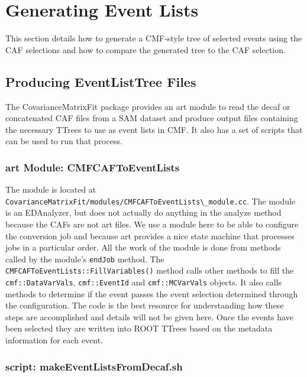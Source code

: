 \section{Generating Event Lists}

This section details how to generate a CMF-style tree of selected events using the CAF selections and how to compare the generated tree to the CAF selection.

\subsection{Producing EventListTree Files}

The CovarianceMatrixFit package provides an art module to read the decaf or concatenated CAF files from a SAM dataset and produce output files containing the necessary TTrees to use as event lists in CMF.  It also has a set of scripts that can be used to run that process.

\subsubsection{art Module: CMFCAFToEventLists}
The module is located at \lstinline{CovarianceMatrixFit/modules/CMFCAFToEventLists\_module.cc}.  The module is an EDAnalyzer, but does not actually do anything in the analyze method because the CAFs are not art files.  We use a module here to be able to configure the conversion job and because art provides a nice state machine that processes jobs in a particular order.  All the work of the module is done from methods called by the module's \lstinline{endJob} method.  The \lstinline{CMFCAFToEventLists::FillVariables()} method calls other methods to fill the \lstinline{cmf::DataVarVals}, \lstinline{cmf::EventId} and \lstinline{cmf::MCVarVals} objects.  It also calls methods to determine if the event passes the event selection determined through the configuration.  The code is the best resource for understanding how these steps are accomplished and details will not be given here.  Once the events have been selected they are written into ROOT TTrees based on the metadata information for each event.  

\subsubsection{script: makeEventListsFromDecaf.sh}

